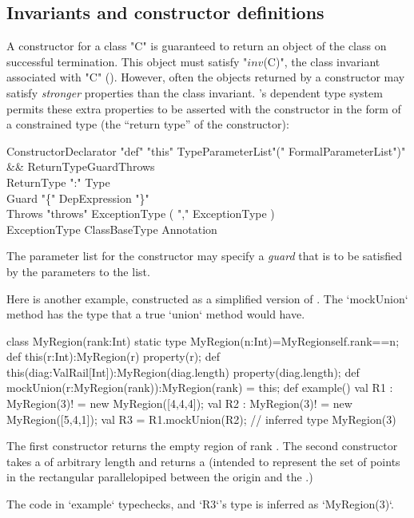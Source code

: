 \subsection{Invariants and constructor definitions}

A constructor for a class \xcd"C" is guaranteed to return an object of the
class on successful termination. This object must satisfy  \xcdmath"$\mathit{inv}$(C)", the
class invariant associated with \xcd"C" ().
However,
often the objects returned by a constructor may satisfy {\em stronger}
properties than the class invariant. \Xten{}'s dependent type system
permits these extra properties to be asserted with the constructor in
the form of a constrained type (the ``return type'' of the constructor):

\begin{grammar}
ConstructorDeclarator \:
  \xcd"def" \xcd"this" TypeParameterList\opt \xcd"(" FormalParameterList\opt \xcd")" \\
  && ReturnType\opt Guard\opt Throws\opt \\
ReturnType    \: \xcd":" Type \\
Guard   \: "\{" DepExpression "\}" \\
Throws    \: \xcd"throws" ExceptionType  ( \xcd"," ExceptionType )\star \\
ExceptionType \: ClassBaseType Annotation\star \\
\end{grammar}

\label{ConstructorGuard}

The parameter list for the constructor
may specify a \emph{guard} that is to be satisfied by the parameters
to the list.

\begin{example}
Here is another example, constructed as a simplified 
version of .  The \xcd`mockUnion` method 
has the type that a true \xcd`union` method would have.

\begin{xten}
class MyRegion(rank:Int) {
  static type MyRegion(n:Int)=MyRegion{self.rank==n};
  def this(r:Int):MyRegion(r) {
    property(r);
  }
  def this(diag:ValRail[Int]):MyRegion(diag.length){ 
    property(diag.length);
  }
  def mockUnion(r:MyRegion(rank)):MyRegion(rank) = this;
  def example() {
    val R1 : MyRegion(3)! = new MyRegion([4,4,4]); 
    val R2 : MyRegion(3)! = new MyRegion([5,4,1]); 
    val R3 = R1.mockUnion(R2); // inferred type MyRegion(3)
  }
}
\end{xten}
%
The first constructor returns the empty region of rank .  The
second constructor takes a  of arbitrary length
 and returns a  (intended to represent the set
of points in the rectangular parallelopiped between the origin and the
.)

The code in \xcd`example` typechecks, and \xcd`R3`'s type is inferred as
\xcd`MyRegion(3)`.  


\end{example}

